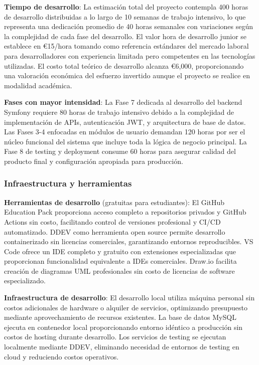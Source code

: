 \documentclass[12pt,a4paper,oneside]{report}
\begin{document}
\textbf{Tiempo de desarrollo}: La estimación total del proyecto contempla 400 horas de desarrollo distribuidas a lo largo de 10 semanas de trabajo intensivo, lo que representa una dedicación promedio de 40 horas semanales con variaciones según la complejidad de cada fase del desarrollo. El valor hora de desarrollo junior se establece en €15/hora tomando como referencia estándares del mercado laboral para desarrolladores con experiencia limitada pero competentes en las tecnologías utilizadas. El costo total teórico de desarrollo alcanza €6,000, proporcionando una valoración económica del esfuerzo invertido aunque el proyecto se realice en modalidad académica.

\textbf{Fases con mayor intensidad}: La Fase 7 dedicada al desarrollo del backend Symfony requiere 80 horas de trabajo intensivo debido a la complejidad de implementación de APIs, autenticación JWT, y arquitectura de base de datos. Las Fases 3-4 enfocadas en módulos de usuario demandan 120 horas por ser el núcleo funcional del sistema que incluye toda la lógica de negocio principal. La Fase 8 de testing y deployment consume 60 horas para asegurar calidad del producto final y configuración apropiada para producción.

\subsubsection{Infraestructura y
herramientas}\label{infraestructura-y-herramientas}

\textbf{Herramientas de desarrollo} (gratuitas para estudiantes): El GitHub Education Pack proporciona acceso completo a repositorios privados y GitHub Actions sin costo, facilitando control de versiones profesional y CI/CD automatizado. DDEV como herramienta open source permite desarrollo containerizado sin licencias comerciales, garantizando entornos reproducibles. VS Code ofrece un IDE completo y gratuito con extensiones especializadas que proporcionan funcionalidad equivalente a IDEs comerciales. Draw.io facilita creación de diagramas UML profesionales sin costo de licencias de software especializado.

\textbf{Infraestructura de desarrollo}: El desarrollo local utiliza máquina personal sin costos adicionales de hardware o alquiler de servicios, optimizando presupuesto mediante aprovechamiento de recursos existentes. La base de datos MySQL ejecuta en contenedor local proporcionando entorno idéntico a producción sin costos de hosting durante desarrollo. Los servicios de testing se ejecutan localmente mediante DDEV, eliminando necesidad de entornos de testing en cloud y reduciendo costos operativos.
\end{document}

